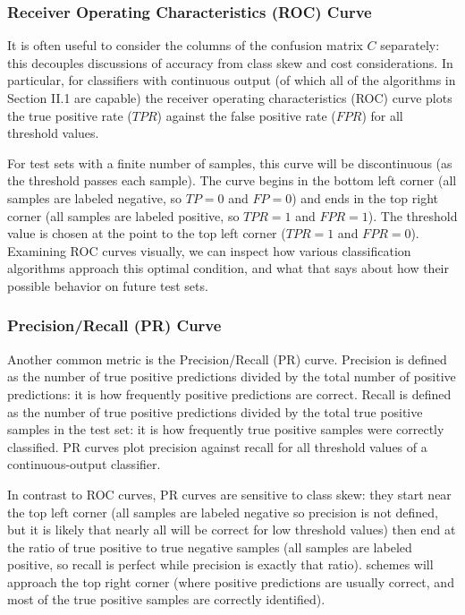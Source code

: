 \documentclass{article}
\begin{document}
\subsubsection{Receiver Operating Characteristics (ROC) Curve}
It is often useful to consider the columns of the confusion matrix $C$ separately: this decouples discussions of accuracy from class skew and cost considerations. In particular, for classifiers with continuous output (of which all of the algorithms in Section II.1 are capable) the receiver operating characteristics (ROC) curve plots the true positive rate ($TPR$) against the false positive rate ($FPR$) for all threshold values.

For test sets with a finite number of samples, this curve will be discontinuous (as the threshold passes each sample). The curve begins in the bottom left corner (all samples are labeled negative, so $TP=0$ and $FP=0$) and ends in the top right corner (all samples are labeled positive, so $TPR=1$ and $FPR=1$). The threshold value is chosen at the point  to the top left corner ($TPR=1$ and $FPR=0$). Examining ROC curves visually, we can inspect how various classification algorithms approach this optimal condition, and what that says about how their possible behavior on future test sets.

\subsubsection{Precision/Recall (PR) Curve}
Another common metric is the Precision/Recall (PR) curve. Precision is defined as the number of true positive predictions divided by the total number of positive predictions: it is how frequently positive predictions are correct. Recall is defined as the number of true positive predictions divided by the total true positive samples in the test set: it is how frequently true positive samples were correctly classified. PR curves plot precision against recall for all threshold values of a continuous-output classifier.

In contrast to ROC curves, PR curves are sensitive to class skew: they start near the top left corner (all samples are labeled negative so precision is not defined, but it is likely that nearly all will be correct for low threshold values) then end at the ratio of true positive to true negative samples (all samples are labeled positive, so recall is perfect while precision is exactly that ratio).  schemes will approach the top right corner (where positive predictions are usually correct, and most of the true positive samples are correctly identified).
\end{document}
